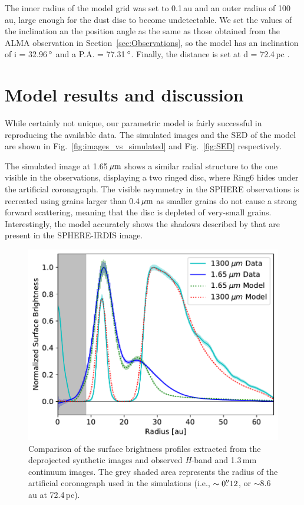 \documentclass[letters,usenatbib,times]{mnras}
\begin{document}
The inner radius of the model grid was set to 0.1\,au and an outer radius of 100\,au, large enough for the dust disc to become undetectable. We set the values of the inclination an the position angle as the same as those obtained from the ALMA observation in Section~\ref{sec:Observations}, so the model has an inclination of i = 32.96\,$\hbox{$^\circ$}$ and a P.A. = 77.31\,$\hbox{$^\circ$}$. Finally, the distance is set at d = 72.4\,pc \citep{Gaia}.

\section{Model results and discussion} \label{sec:results}

While certainly not unique, our parametric model is fairly successful in reproducing the available data. The simulated images and the SED of the model are shown in Fig.~\ref{fig:images_vs_simulated} and Fig.~\ref{fig:SED} respectively.

The simulated image at 1.65\,$\hbox{$\mu$m}$ shows a similar radial structure to the one visible in the observations, displaying a two ringed disc, where Ring6 hides under the artificial coronagraph. The visible asymmetry in the SPHERE observations is recreated using grains larger than 0.4\,$\hbox{$\mu$m}$ as smaller grains do not cause a strong forward scattering, meaning that the disc is depleted of very-small grains. Interestingly, the model accurately shows the shadows described by \citet{dOrazi} that are present in the SPHERE-IRDIS image.

\begin{figure}
	\includegraphics[width=\columnwidth]{comp_fig_all_profiles_au.pdf}
    \caption{Comparison of the surface brightness profiles extracted from the deprojected synthetic images and observed \textit{H}-band and 1.3\,mm continuum images. The grey shaded area represents the radius of the artificial coronagraph used in the simulations (i.e., $\sim0\hbox{$.\!\!^{\prime\prime}$} 12$, or $\sim$8.6\,au at 72.4\,pc).}
    \label{fig:radprofiles}
\end{figure}
\end{document}
